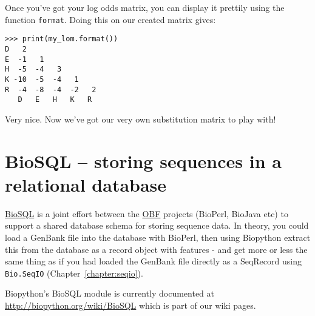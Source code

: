 Once you've got your log odds matrix, you can display it prettily
using the function \verb|format|. Doing this on our created matrix
gives:

\begin{verbatim}
>>> print(my_lom.format())
D   2
E  -1   1
H  -5  -4   3
K -10  -5  -4   1
R  -4  -8  -4  -2   2
   D   E   H   K   R
\end{verbatim}

Very nice. Now we've got our very own substitution matrix to play with!

\section{BioSQL -- storing sequences in a relational database}
\label{sec:BioSQL}
\href{https://www.biosql.org/}{BioSQL} is a joint effort between the
\href{https://www.open-bio.org/wiki/Main_Page}{OBF} projects (BioPerl, BioJava etc) to support a
shared database schema for storing sequence data. In theory, you could load a
GenBank file into the database with BioPerl, then using Biopython extract this
from the database as a record object with features - and get more or less the same
thing as if you had loaded the GenBank file directly as a SeqRecord using
\verb|Bio.SeqIO| (Chapter~\ref{chapter:seqio}).

Biopython's BioSQL module is currently documented at
\url{http://biopython.org/wiki/BioSQL} which is part of our wiki pages.
